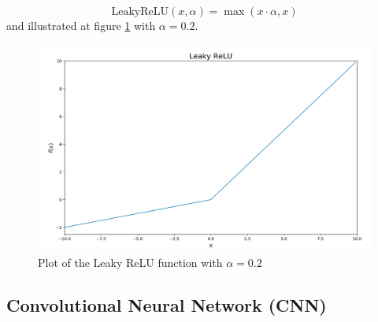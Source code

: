 \documentclass[11pt]{article}
\begin{document}
\begin{equation}
    \text{LeakyReLU}(x, \alpha) = \max(x \cdot \alpha, x)
\end{equation}
and illustrated at figure \ref{fig:deep_learning_leaky_relu}
with $\alpha = 0.2$.
\begin{figure}[!h]
    \centering
    \includegraphics[scale = 0.28]{figurer/deep_learning/leaky_relu.png}
    \caption{Plot of the Leaky ReLU function with $\alpha = 0.2$}
    \label{fig:deep_learning_leaky_relu}
\end{figure}



\subsection{Convolutional Neural Network (CNN)}
\end{document}
